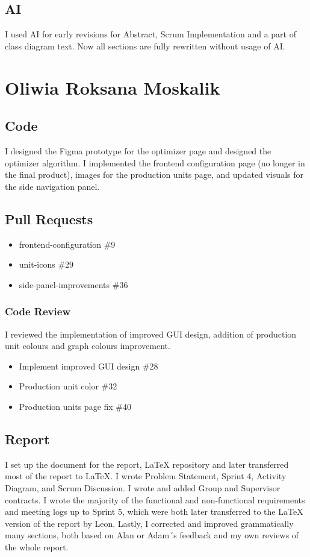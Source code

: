 \subsection*{AI}
I used AI for early revisions for Abstract, Scrum Implementation and a part of class diagram text. Now all sections are fully rewritten without usage of AI.


\section*{Oliwia Roksana Moskalik}
\subsection*{Code}
I designed the Figma prototype for the optimizer page and designed the optimizer algorithm. I implemented the frontend configuration page (no longer in the final product), images for the production units page, and updated visuals for the side navigation panel.
\subsection*{Pull Requests}
\begin{itemize}
    \item frontend-configuration \#9
    \item unit-icons \#29
    \item side-panel-improvements \#36
\end{itemize}
\subsubsection*{Code Review}
I reviewed the implementation of improved GUI design, addition of production unit colours and graph colours improvement.
\begin{itemize}
    \item Implement improved GUI design \#28
    \item Production unit color \#32
    \item Production units page fix \#40
\end{itemize}
\subsection*{Report}
I set up the document for the report, LaTeX repository and later transferred most of the report to LaTeX. I wrote Problem Statement, Sprint 4, Activity Diagram, and Scrum Discussion. I wrote and added Group and Supervisor contracts. I wrote the majority of the functional and non-functional requirements and meeting logs up to Sprint 5, which were both later transferred to the LaTeX version of the report by Leon. Lastly, I corrected and improved grammatically many sections, both based on Alan or Adam´s feedback and my own reviews of the whole report.
